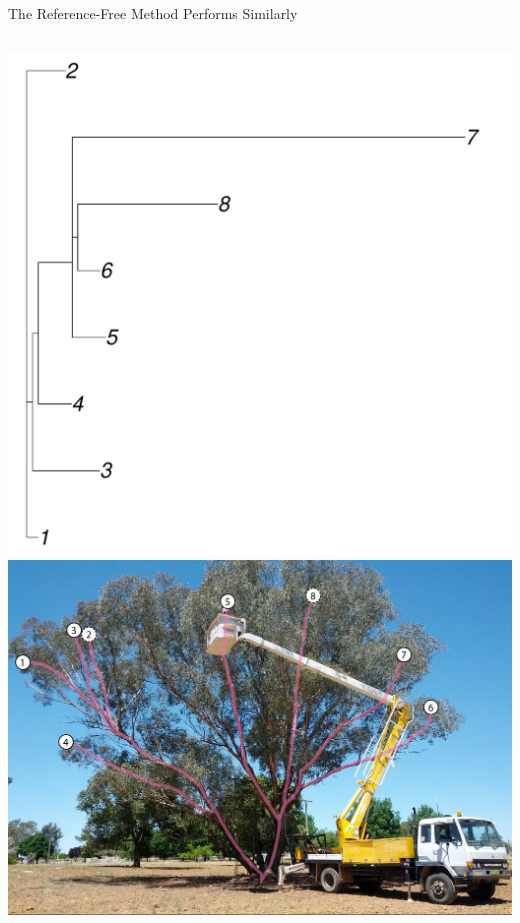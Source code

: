 \documentclass{beamer}
\begin{document}
\begin{frame}{The Reference-Free Method Performs Similarly}
	\begin{columns}
		\includegraphics[width=\linewidth]{figures/disco_tree2.pdf}
		\includegraphics[width=\linewidth]{figures/labeled_tree.jpg}
	\end{columns}
\end{frame}

\end{document}
